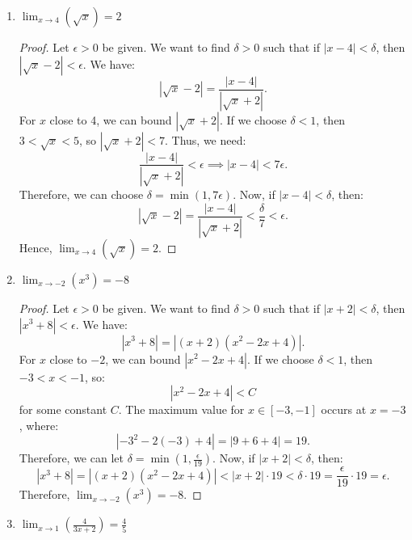\documentclass[12pt]{article}
\begin{document}
\begin{enumerate}[label=(\alph*)]
\begin{proof}
      Thus, we need:
      \[|x + 2||3x - 7| < |x + 2| \cdot 16\]
      Therefore, we can choose $\delta = \min\left(1, \frac{\epsilon}{16}\right)$.
      Now, if $|x + 2| < \delta$, then:
      \[|x - 3x^2 + 14| = |(x + 2)(3x - 7)| < |x + 2| \cdot 16 < \delta \cdot 16 = \frac{\epsilon}{16} \cdot 16 = \epsilon.\] 
    \end{proof}
    \item $\lim_{x \to 4}(\sqrt{x}) = 2$
    
    \begin{proof}
      Let $\epsilon > 0$ be given. We want to find $\delta > 0$ such that if $|x - 4| < \delta$, then $|\sqrt{x} - 2| < \epsilon$.
      We have:
      \[|\sqrt{x} - 2| = \frac{|x - 4|}{|\sqrt{x} + 2|}.\]
      For $x$ close to 4, we can bound $|\sqrt{x} + 2|$. If we choose $\delta < 1$, then $3 < \sqrt{x} < 5$, so $|\sqrt{x} + 2| < 7$.
      Thus, we need:
      \[\frac{|x - 4|}{|\sqrt{x} + 2|} < \epsilon \implies |x - 4| < 7\epsilon.\]
      Therefore, we can choose $\delta = \min(1, 7\epsilon)$.
      Now, if $|x - 4| < \delta$, then:
      \[|\sqrt{x} - 2| = \frac{|x - 4|}{|\sqrt{x} + 2|} < \frac{\delta}{7} < \epsilon.\]
      Hence, $\lim_{x \to 4}(\sqrt{x}) = 2$. 
    \end{proof}
    \item $\lim_{x \to -2}(x^3) = -8$
    
    \begin{proof}
      Let $\epsilon > 0$ be given. We want to find $\delta > 0$ such that if $|x + 2| < \delta$, then $|x^3 + 8| < \epsilon$.
      We have:
      \[|x^3 + 8| = |(x + 2)(x^2 - 2x + 4)|.\]
      For $x$ close to $-2$, we can bound $|x^2 - 2x + 4|$. If we choose $\delta < 1$, then $-3 < x < -1$, so:
      \[|x^2 - 2x + 4| < C\]
      for some constant $C$. The maximum value for $x \in \left[-3, -1\right]$ occurs at $x = -3$, where:
      \[|-3^2 - 2(-3) + 4| = |9 + 6 + 4| = 19.\]
      Therefore, we can let $\delta = \min(1, \frac{\epsilon}{19})$.
      Now, if $|x + 2| < \delta$, then:
      \[|x^3 + 8| = |(x + 2)(x^2 - 2x + 4)| < |x + 2| \cdot 19 < \delta \cdot 19 = \frac{\epsilon}{19} \cdot 19 = \epsilon.\]
      Therefore, $\lim_{x \to -2}(x^3) = -8$.
    \end{proof}

    \item $\lim_{x \to 1}(\frac{4}{3x+2}) = \frac{4}{5}$
    

\end{enumerate}
\end{document}
